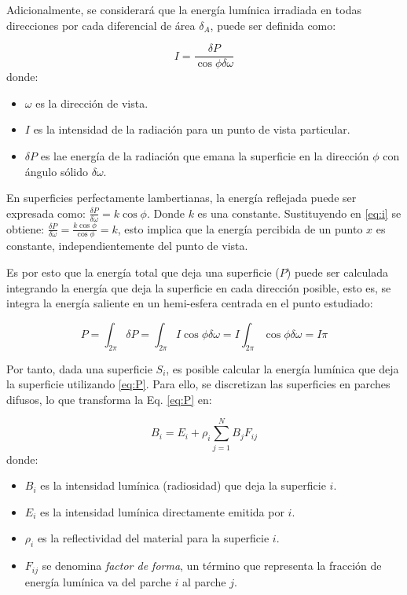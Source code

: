 Adicionalmente, se considerará que la energía lumínica irradiada en todas direcciones por cada diferencial de área $\delta_{A}$, puede ser definida como:

\begin{equation}
    I = \frac{\delta{P}}{\cos{\phi\delta\omega}} \label{eq:i}
\end{equation}
donde:
\begin{itemize}
	\item $\omega$ es la dirección de vista.
    \item $I$ es la intensidad de la radiación para un punto de vista particular.
    \item $\delta{P}$ es lae energía de la radiación que emana la superficie en la dirección $\phi$ con ángulo sólido $\delta\omega$.
\end{itemize}

En superficies perfectamente lambertianas, la energía reflejada puede ser expresada como: $\frac{\delta{P}}{\delta{\omega}} = k\cos{\phi}$. Donde $k$ es una constante.
Sustituyendo en \eqref{eq:i} se obtiene: $\frac{\delta{P}}{\delta{\omega}} = \frac{k\cos{\phi}}{\cos{\phi}} = k$, esto implica que la energía percibida de un punto $x$ 
es constante, independientemente del punto de vista.

Es por esto que la energía total que deja una superficie ($P$) puede ser calculada integrando la energía que deja la superficie en cada dirección posible, esto es, se integra la energía saliente en un hemi-esfera centrada en el punto estudiado:

\begin{equation}
    P = \int_{2\pi} \delta{P} = \int_{2\pi} I\cos{\phi}\delta{\omega} = I \int_{2\pi} \cos{\phi}\delta{\omega} = I\pi
    \label{eq:P}
\end{equation}

Por tanto, dada una superficie $S_{i}$, es posible calcular la energía lumínica que deja la superficie utilizando \eqref{eq:P}. Para ello, se discretizan las superficies en parches difusos, lo que transforma la Eq. \eqref{eq:P} en:

\begin{equation}
    B_{i} = E_{i} + \rho_{i} \sum_{j=1}^{N} B_{j} F_{ij} \label{eq:radiosity}
\end{equation}
donde:
\begin{itemize}
    \item $B_{i}$ es la intensidad lumínica (radiosidad) que deja la superficie $i$.
    \item $E_{i}$ es la intensidad lumínica directamente emitida por $i$.
    \item $\rho_{i}$ es la reflectividad del material para la superficie $i$.
    \item $F_{ij}$ se denomina \textit{factor de forma}, un término que representa la fracción de energía lumínica va del parche $i$ al parche $j$. 
\end{itemize}

